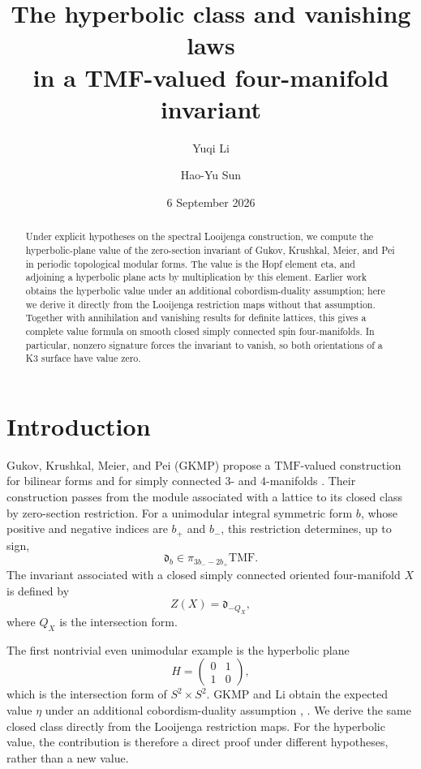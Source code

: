 \documentclass[11pt,a4paper]{amsart}
\title[The hyperbolic class and vanishing laws]{The hyperbolic class and vanishing laws\\in a TMF-valued four-manifold invariant}
\author{Yuqi Li}
\author{Hao-Yu Sun}
\date{6 September 2026}
\newcommand{\TMF}{\mathrm{TMF}}
\newcommand{\dclass}{\mathfrak d}
\theoremstyle{plain}
\theoremstyle{definition}
\theoremstyle{remark}
\begin{document}
\begin{abstract}
Under explicit hypotheses on the spectral Looijenga construction,
we compute the hyperbolic-plane value of the zero-section invariant
of Gukov, Krushkal, Meier, and Pei in periodic topological modular
forms. The value is the Hopf element eta, and adjoining a hyperbolic
plane acts by multiplication by this element. Earlier work obtains
the hyperbolic value under an additional cobordism-duality assumption;
here we derive it directly from the Looijenga restriction maps without
that assumption. Together with annihilation and vanishing results for
definite lattices, this gives a complete value formula on smooth closed
simply connected spin four-manifolds. In particular, nonzero signature
forces the invariant to vanish, so both orientations of a K3 surface
have value zero.
\end{abstract}

\maketitle
\enlargethispage{2pt}%

\section{Introduction}

Gukov, Krushkal, Meier, and Pei (GKMP) propose a
$\TMF$-valued construction for bilinear forms and for simply
connected $3$- and $4$-manifolds \cite{GKMP}. Their construction
passes from the module associated with a lattice to its closed
class by zero-section restriction. For a unimodular integral
symmetric form $b$, whose positive and negative indices are
$b_+$ and $b_-$, this restriction determines, up to sign,
\begin{equation}\label{eq:intro-degree}
 \dclass_b\in\pi_{3b_- -2b_+}\TMF.
\end{equation}
The invariant associated with a closed simply connected
oriented four-manifold $X$ is defined by
\begin{equation}\label{eq:intro-Z}
 Z(X)=\dclass_{-Q_X},
\end{equation}
where $Q_X$ is the intersection form.

The first nontrivial even unimodular example is the hyperbolic plane
\[
 H=\begin{pmatrix}0&1\\1&0\end{pmatrix},
\]
which is the intersection form of $S^2\times S^2$.
GKMP and Li obtain the expected value $\eta$ under an
additional cobordism-duality assumption
\cite[Question~7.14 and Example~8.1]{GKMP},
\cite[Theorem~7.5]{Li}. We derive the same closed class directly
from the Looijenga restriction maps. For the hyperbolic value,
the contribution is therefore a direct proof under different
hypotheses, rather than a new value.
\end{document}
